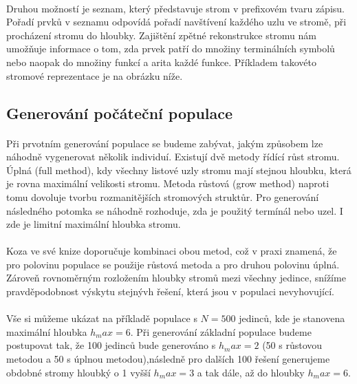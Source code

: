 \documentclass[bc,male,java,dept460]{diploma}		%
\begin{document}
\paragraph*{}
Druhou možností je seznam, který představuje strom v prefixovém tvaru zápisu. Pořadí prvků v seznamu odpovídá pořadí navštívení každého uzlu ve stromě, při procházení stromu do hloubky. Zajištění zpětné rekonstrukce stromu nám umožňuje informace o tom, zda prvek patří do množiny terminálních symbolů nebo naopak do množiny funkcí a arita každé funkce. Příkladem takovéto stromové reprezentace je na obrázku níže.


\subsection{Generování počáteční populace}
\paragraph*{}
Při prvotním generování populace se budeme zabývat, jakým způsobem lze náhodně vygenerovat několik individuí. Existují dvě metody řídící růst stromu. Úplná (full method), kdy všechny listové uzly stromu mají stejnou hloubku, která je rovna maximální velikosti stromu. Metoda růstová (grow method) naproti tomu dovoluje tvorbu rozmanitějších stromových struktůr. Pro generování následného potomka se náhodně rozhoduje, zda je použitý termínál nebo uzel. I zde je limitní maximální hloubka stromu.

\paragraph*{}
Koza ve své knize \cite{kozagp} doporučuje kombinaci obou metod, což v praxi znamená, že pro polovinu populace se použije růstová metoda a pro druhou polovinu úplná. Zároveň rovnoměrným rozložením hloubky stromů mezi všechny jedince, snížíme pravděpodobnost výskytu stejnývh řešení, která jsou v populaci nevyhovující. 

\paragraph*{}
Vše si můžeme ukázat na příkladě populace s $N=500$ jedinců, kde je stanovena maximální hloubka $h_max=6$. Při generování základní populace budeme postupovat tak, že 100 jedinců bude generováno s $h_max=2$ (50 s růstovou metodou a 50 s úplnou metodou),následně pro dalších 100 řešení generujeme obdobné stromy hloubký o 1 vyšší $h_max=3$ a tak dále, až do hloubky $h_max=6$.
\end{document}
